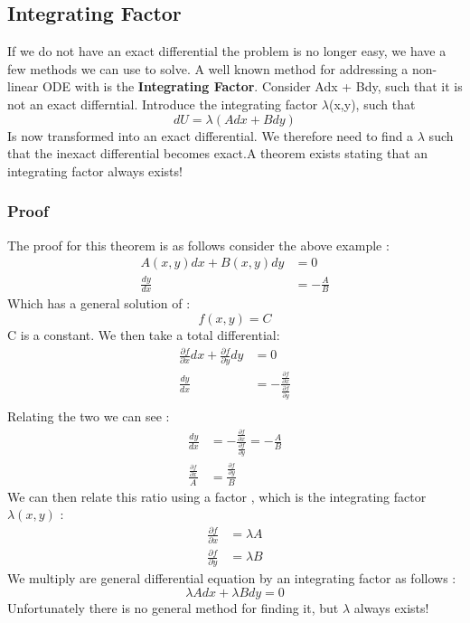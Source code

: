 \documentclass{article}
\newcommand{\be}{\begin{equation}}
\newcommand{\ee}{\end{equation}}
\begin{document}
\subsection*{Integrating Factor}
If we do not have an exact differential the problem is no longer easy, we have a few methods we can use to solve.
A well known method for addressing a non-linear ODE with is the \textbf{Integrating Factor}.
Consider Adx + Bdy, such that it is not an exact differntial.
Introduce the integrating factor $\lambda$(x,y), such that
\be
dU = \lambda(Adx + Bdy)
\ee
Is now transformed into an exact differential.
We therefore need to find a $\lambda$ such that the inexact differential becomes exact.A theorem exists stating that an integrating factor always exists!
\subsubsection*{Proof}
The proof for this theorem is as follows consider the above example :
\be
\begin{split}
A(x,y)dx + B(x,y)dy &= 0 \\
\frac{dy}{dx} &= -\frac{A}{B}
\end{split}
\ee
Which has a general solution of :
\be
f(x,y) = C
\ee
C is a constant. We then take a total differential:
\be
\begin{split}
\frac{\partial f}{\partial x}dx + \frac{\partial f}{\partial y} dy &= 0 \\
\frac{dy}{dx} &=  - \frac{\frac{\partial f}{\partial x}}{\frac{\partial f}{\partial y}}\\
\end{split}
\ee
Relating the two we can see :
\be
\begin{split}
   \frac{dy}{dx} &=  - \frac{\frac{\partial f}{\partial x}}{\frac{\partial f}{\partial y}}= -\frac{A}{B}\\
   \frac{\frac{\partial f}{\partial x}}{A} &= \frac{\frac{\partial f}{\partial y}}{B}
\end{split}
\ee
We can then relate this ratio using a factor , which is the integrating factor $\lambda(x,y)$ :
\be
\begin{split}
\frac{\partial f}{\partial x} &= \lambda A  \\
\frac{\partial f}{\partial y} &= \lambda B
\end{split}
\ee
We multiply are general differential equation by an integrating factor as follows :
\be
\lambda A dx + \lambda B dy = 0
\ee
Unfortunately there is no general method for finding it, but $\lambda$ always exists!
\end{document}
